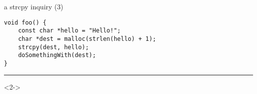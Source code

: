 \begin{frame}[fragile,label=strcpyTooSmall]{a strcpy inquiry (3)}
\lstset{
    language=C++,style=small
}
\begin{lstlisting}
void foo() {
    const char *hello = "Hello!";
    char *dest = malloc(strlen(hello) + 1);
    strcpy(dest, hello);
    doSomethingWith(dest);
}
\end{lstlisting}
\hrule
\begin{visibleenv}<2->
\end{visibleenv}
\end{frame}
